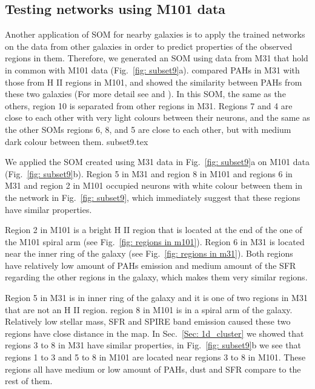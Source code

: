     \subsection{Testing networks using M101 data}
    Another application of SOM for nearby galaxies is to apply the trained networks on the data from other galaxies in order to predict properties of the observed regions in them. %
    Therefore, we generated an SOM using data from M31 that hold in common with M101 data (Fig.~\ref{fig: subset9}a). 
    \cite{Dim15} compared PAHs in M31 with those from H {\sc II} regions in M101, and showed the similarity between PAHs from these two galaxies (For more detail see \cite{Dim15} and \cite{Gordon08}).
    In this SOM, the same as the others, region 10 is separated from other regions in M31.
    Regions 7 and 4 are close to each other with very light colours between their neurons, and the same as the other SOMs regions 6, 8, and 5 are close to each other, but with medium dark colour between them.
    {subset9.tex}
    
    We applied the SOM created using M31 data in Fig.~\ref{fig: subset9}a on M101 data (Fig.~\ref{fig: subset9}b).
    Region 5 in M31 and region 8 in M101 and regions 6 in M31 and region 2 in M101 occupied neurons with white colour between them in the network in Fig.~\ref{fig: subset9}, which immediately suggest that these regions have similar properties. 
    
    Region 2 in M101 is a bright H {\sc II} region that is located at the end of the one of the M101 spiral arm (see Fig.~\ref{fig: regions in m101}). 
    Region 6 in M31 is located near the inner ring of the galaxy (see Fig.~\ref{fig: regions in m31}).
    Both regions have relatively low amount of PAHs emission and medium amount of the SFR regarding the other regions in the galaxy, which makes them very similar regions.
    
    Region 5 in M31 is in inner ring of the galaxy and it is one of two regions in M31 that are not an  H {\sc II} region.
    region 8 in M101 is in a spiral arm of the galaxy.
    Relatively low stellar mass, SFR and SPIRE band emission caused these two regions have close distance in the map.
    In Sec.~\ref{Sec: 1d_cluster} we showed that regions 3 to 8 in M31 have similar properties, in Fig.~\ref{fig: subset9}b we see that regions 1 to 3 and 5 to 8 in M101 are located near regions 3 to 8 in M101. 
    These regions all have medium or low amount of PAHs, dust and SFR compare to the rest of them.
    
